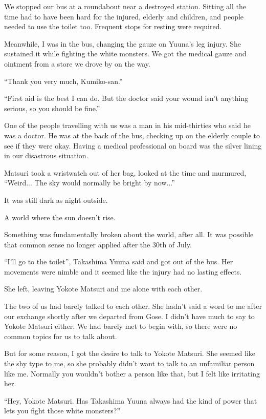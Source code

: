 We stopped our bus at a roundabout near a destroyed station. Sitting all the time had to have been hard for the injured, elderly and children, and people needed to use the toilet too. Frequent stops for resting were required.

Meanwhile, I was in the bus, changing the gauze on Yuuna's leg injury. She sustained it while fighting the white monsters. We got the medical gauze and ointment from a store we drove by on the way.

``Thank you very much, Kumiko-san.''

``First aid is the best I can do. But the doctor said your wound isn't anything serious, so you should be fine.''

One of the people travelling with us was a man in his mid-thirties who said he was a doctor. He was at the back of the bus, checking up on the elderly couple to see if they were okay. Having a medical professional on board was the silver lining in our disastrous situation.

Matsuri took a wristwatch out of her bag, looked at the time and murmured, ``Weird... The sky would normally be bright by now...''

It was still dark as night outside.

A world where the sun doesn't rise.

Something was fundamentally broken about the world, after all. It was possible that common sense no longer applied after the 30th of July.

``I'll go to the toilet'', Takashima Yuuna said and got out of the bus. Her movements were nimble and it seemed like the injury had no lasting effects.

She left, leaving Yokote Matsuri and me alone with each other.

The two of us had barely talked to each other. She hadn't said a word to me after our exchange shortly after we departed from Gose. I didn't have much to say to Yokote Matsuri either. We had barely met to begin with, so there were no common topics for us to talk about.

But for some reason, I got the desire to talk to Yokote Matsuri. She seemed like the shy type to me, so she probably didn't want to talk to an unfamiliar person like me. Normally you wouldn't bother a person like that, but I felt like irritating her.

``Hey, Yokote Matsuri. Has Takashima Yuuna always had the kind of power that lets you fight those white monsters?''

